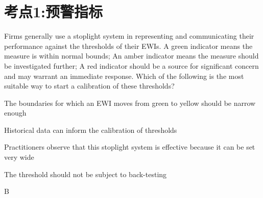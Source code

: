 \documentclass{article}
\newcounter{question} %
\begin{document}
 \tableofcontents %
\newpage




\section{考点1:预警指标}
\setcounter{question}{0}

\begin{question}
    Firms generally use a stoplight system in representing and communicating their performance against the thresholds of their EWIs. A green indicator means the measure is within normal bounds; An amber indicator means the measure should be investigated further; A red indicator should be a source for significant concern and may warrant an immediate response. Which of the following is the most suitable way to start a calibration of these thresholds?
\end{question}

\begin{choices}
    \item The boundaries for which an EWI moves from green to yellow should be narrow enough
    \item Historical data can inform the calibration of thresholds
    \item Practitioners observe that this stoplight system is effective because it can be set very wide
    \item The threshold should not be subject to back-testing
\end{choices}

\begin{correctanswer}
    B
\end{correctanswer}
\end{document}
